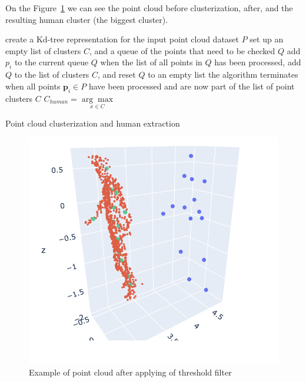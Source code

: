 On the Figure~\ref{img:after-clustering} we can see the point cloud before clusterization, after, and the resulting human cluster (the biggest cluster). \\

\begin{algorithm}[H]
\label{alg:clusterization}
\SetAlgoLined
{}
 create a Kd-tree representation for the input point cloud dataset $P$ \;
 set up an empty list of clusters $C$, and a queue of the points that need to be checked $Q$ \;
 {
    add $p_i$ to the current queue $Q$ \;
    when the list of all points in $Q$ has been processed, add $Q$ to the list of clusters $C$, and reset $Q$ to an empty list \;
}
the algorithm terminates when all points $\boldsymbol{p}_i \in P$ have been processed and are now part of the list of point clusters $C$ \;
$C_{human} = \underset{ x \in C }{\arg\max}$

\caption{Point cloud clusterization and human extraction \parencite{noauthor_pcl_nodate}}
\end{algorithm}

\begin{figure}[htbp]
    \centerline{\includegraphics[scale=.4]{Figures/template.png}}
    \caption{Example of point cloud after applying of threshold filter}
    \label{img:after-clustering}
\end{figure}

